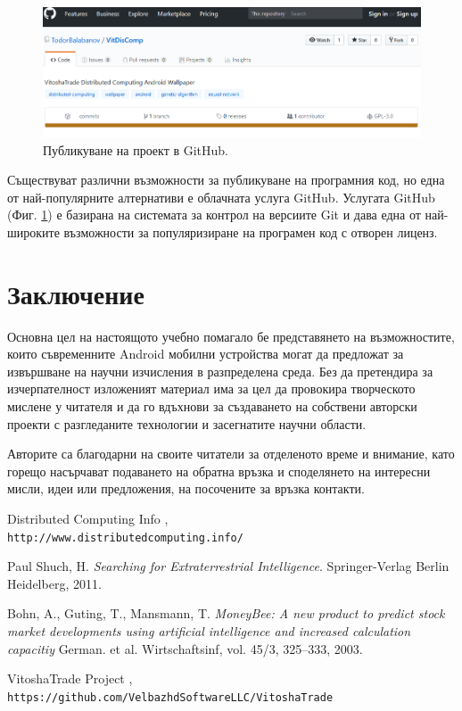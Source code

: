 \documentclass[book,14pt,oneside,openany]{memoir}
\begin{document}
\begin{figure}[h!]
  \centering
  \includegraphics[width=1.0\linewidth]{./images/pic0009.png}
  \caption{Публикуване на проект в GitHub.}
\label{fig:pic0009}
\end{figure}

Съществуват различни възможности за публикуване на програмния код, но една от най-популярните алтернативи е облачната услуга GitHub. Услугата GitHub (Фиг. \ref{fig:pic0009}) е базирана на системата за контрол на версиите Git и дава една от най-широките възможности за популяризиране на програмен код с отворен лиценз. 

\newpage
{}
\chapter*{Заключение}

Основна цел на настоящото учебно помагало бе представянето на възможностите, които съвременните Android мобилни устройства могат да предложат за извършване на научни изчисления в разпределена среда. Без да претендира за изчерпателност изложеният материал има за цел да провокира творческото мислене у читателя и да го вдъхнови за създаването на собствени авторски проекти с разгледаните технологии и засегнатите научни области.  

Авторите са благодарни на своите читатели за отделеното време и внимание, като горещо насърчават подаването на обратна връзка и споделянето на интересни мисли, идеи или предложения, на посочените за връзка контакти.

\newpage
\begin{thebibliography}{99}

 Distributed Computing Info , \\\texttt{http://www.distributedcomputing.info/}

 Paul Shuch, H. \textit{Searching for Extraterrestrial Intelligence}. Springer-Verlag Berlin Heidelberg, 2011.

 Bohn, A., Guting, T., Mansmann, T. \textit{MoneyBee: A new product to predict stock market developments using artificial intelligence and increased calculation capacitiy} German. et al. Wirtschaftsinf, vol. 45/3, 325--333, 2003.

 VitoshaTrade Project , \\\texttt{https://github.com/VelbazhdSoftwareLLC/VitoshaTrade}

\end{thebibliography}

\newpage
\printindex
\end{document}
